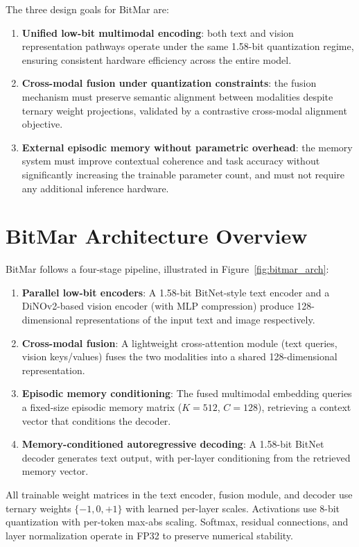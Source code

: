 The three design goals for BitMar are:
\begin{enumerate}
    \item \textbf{Unified low-bit multimodal encoding}: both text and vision representation pathways operate under the same 1.58-bit quantization regime, ensuring consistent hardware efficiency across the entire model.
    \item \textbf{Cross-modal fusion under quantization constraints}: the fusion mechanism must preserve semantic alignment between modalities despite ternary weight projections, validated by a contrastive cross-modal alignment objective.
    \item \textbf{External episodic memory without parametric overhead}: the memory system must improve contextual coherence and task accuracy without significantly increasing the trainable parameter count, and must not require any additional inference hardware.
\end{enumerate}

\section{BitMar Architecture Overview}
\label{sec:bitmar_arch}

BitMar follows a four-stage pipeline, illustrated in Figure~\ref{fig:bitmar_arch}:
\begin{enumerate}
    \item \textbf{Parallel low-bit encoders}: A 1.58-bit BitNet-style text encoder and a DiNOv2-based vision encoder (with MLP compression) produce 128-dimensional representations of the input text and image respectively.
    \item \textbf{Cross-modal fusion}: A lightweight cross-attention module (text queries, vision keys/values) fuses the two modalities into a shared 128-dimensional representation.
    \item \textbf{Episodic memory conditioning}: The fused multimodal embedding queries a fixed-size episodic memory matrix ($K{=}512$, $C{=}128$), retrieving a context vector that conditions the decoder.
    \item \textbf{Memory-conditioned autoregressive decoding}: A 1.58-bit BitNet decoder generates text output, with per-layer conditioning from the retrieved memory vector.
\end{enumerate}

All trainable weight matrices in the text encoder, fusion module, and decoder use ternary weights $\{-1, 0, +1\}$ with learned per-layer scales. Activations use 8-bit quantization with per-token max-abs scaling. Softmax, residual connections, and layer normalization operate in FP32 to preserve numerical stability.

